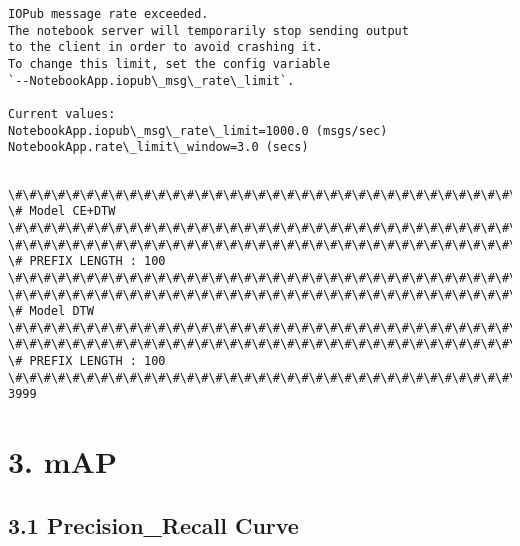\documentclass[11pt]{article}
\begin{document}
    \begin{Verbatim}[commandchars=\\\{\}]
IOPub message rate exceeded.
The notebook server will temporarily stop sending output
to the client in order to avoid crashing it.
To change this limit, set the config variable
`--NotebookApp.iopub\_msg\_rate\_limit`.

Current values:
NotebookApp.iopub\_msg\_rate\_limit=1000.0 (msgs/sec)
NotebookApp.rate\_limit\_window=3.0 (secs)


    \end{Verbatim}

    \begin{Verbatim}[commandchars=\\\{\}]
\#\#\#\#\#\#\#\#\#\#\#\#\#\#\#\#\#\#\#\#\#\#\#\#\#\#\#\#\#\#\#\#\#\#\#\#\#\#\#\#\#\#\#\#\#\#\#\#\#\#\#\#\#\#\#\#\#\#\#\#\#\#\#\#\#\#\#\#\#\#\#\#\#\#\#\#
\# Model CE+DTW
\#\#\#\#\#\#\#\#\#\#\#\#\#\#\#\#\#\#\#\#\#\#\#\#\#\#\#\#\#\#\#\#\#\#\#\#\#\#\#\#\#\#\#\#\#\#\#\#\#\#\#\#\#\#\#\#\#\#\#\#\#\#\#\#\#\#\#\#\#\#\#\#\#\#\#\#
\#\#\#\#\#\#\#\#\#\#\#\#\#\#\#\#\#\#\#\#\#\#\#\#\#\#\#\#\#\#\#\#\#\#\#\#\#\#\#\#\#\#\#\#\#\#\#\#\#\#\#\#\#\#\#\#\#\#\#\#\#\#\#\#\#\#\#\#\#\#\#\#\#\#\#\#
\# PREFIX LENGTH : 100
\#\#\#\#\#\#\#\#\#\#\#\#\#\#\#\#\#\#\#\#\#\#\#\#\#\#\#\#\#\#\#\#\#\#\#\#\#\#\#\#\#\#\#\#\#\#\#\#\#\#\#\#\#\#\#\#\#\#\#\#\#\#\#\#\#\#\#\#\#\#\#\#\#\#\#\#
\#\#\#\#\#\#\#\#\#\#\#\#\#\#\#\#\#\#\#\#\#\#\#\#\#\#\#\#\#\#\#\#\#\#\#\#\#\#\#\#\#\#\#\#\#\#\#\#\#\#\#\#\#\#\#\#\#\#\#\#\#\#\#\#\#\#\#\#\#\#\#\#\#\#\#\#
\# Model DTW
\#\#\#\#\#\#\#\#\#\#\#\#\#\#\#\#\#\#\#\#\#\#\#\#\#\#\#\#\#\#\#\#\#\#\#\#\#\#\#\#\#\#\#\#\#\#\#\#\#\#\#\#\#\#\#\#\#\#\#\#\#\#\#\#\#\#\#\#\#\#\#\#\#\#\#\#
\#\#\#\#\#\#\#\#\#\#\#\#\#\#\#\#\#\#\#\#\#\#\#\#\#\#\#\#\#\#\#\#\#\#\#\#\#\#\#\#\#\#\#\#\#\#\#\#\#\#\#\#\#\#\#\#\#\#\#\#\#\#\#\#\#\#\#\#\#\#\#\#\#\#\#\#
\# PREFIX LENGTH : 100
\#\#\#\#\#\#\#\#\#\#\#\#\#\#\#\#\#\#\#\#\#\#\#\#\#\#\#\#\#\#\#\#\#\#\#\#\#\#\#\#\#\#\#\#\#\#\#\#\#\#\#\#\#\#\#\#\#\#\#\#\#\#\#\#\#\#\#\#\#\#\#\#\#\#\#\#
3999

    \end{Verbatim}

    \section{3. mAP}\label{map}

    \subsection{3.1 Precision\_Recall Curve}\label{precision_recall-curve}
\end{document}
